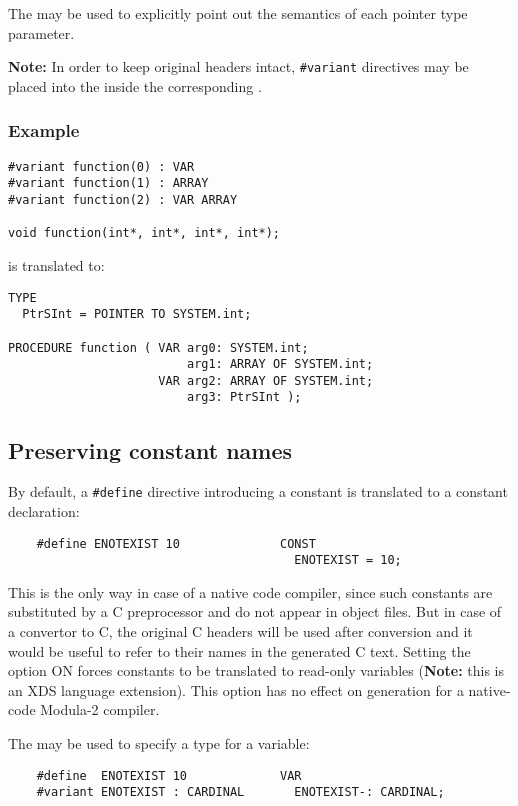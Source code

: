 The  may be used to explicitly point out the semantics
of each pointer type parameter.

{\bf Note:} In order to keep original headers intact, {\tt \#variant}
directives may be placed into the \ProjectFile{} inside the corresponding
.

\subsubsection*{Example}

\begin{verbatim}
#variant function(0) : VAR
#variant function(1) : ARRAY
#variant function(2) : VAR ARRAY

void function(int*, int*, int*, int*);
\end{verbatim}

is translated to:

\begin{verbatim}
TYPE
  PtrSInt = POINTER TO SYSTEM.int;

PROCEDURE function ( VAR arg0: SYSTEM.int;
                         arg1: ARRAY OF SYSTEM.int;
                     VAR arg2: ARRAY OF SYSTEM.int;
                         arg3: PtrSInt );
\end{verbatim}

\subsection{Preserving constant names}
\label{using:modrules:constants}

By default, a \verb'#define' directive introducing a constant is
translated to a constant declaration:

\verb'    #define ENOTEXIST 10              CONST            ' \\
\verb'                                        ENOTEXIST = 10;'

This is the only way in case of a native code \mt{} compiler, since
such constants are substituted by a C preprocessor and do not appear
in object files. But in case of a convertor to C, the original C headers
will be used after conversion and it would be useful to refer to
their names in the generated C text. Setting the 
option ON forces constants to be translated to read-only variables
({\bf Note:} this is an XDS language extension). This option has no
effect on generation for a native-code Modula-2 compiler.

The  may be used to specify a type for a variable:

\verb'    #define  ENOTEXIST 10             VAR' \\
\verb'    #variant ENOTEXIST : CARDINAL       ENOTEXIST-: CARDINAL;'


